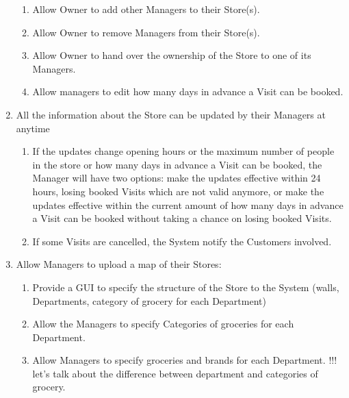 \documentclass[a4paper, 10pt, oneside]{article}
\newcommand*{\lorenzo}[1]{\textcolor{BurntOrange}{#1}}
\begin{document}
\begin{enumerate}[align=left, label={R.\arabic{*}}]
\begin{enumerate}[label={-}]
         \item \label{req:man:updateStoreInfo:addMan}Allow Owner to add other Managers to their Store(s).
        \item \label{req:man:updateStoreInfo:removeMan}Allow Owner to remove Managers from their Store(s).
        \item \label{req:man:updateStoreInfo:handOwnership}Allow Owner to hand over the ownership of the Store to one of its Managers.
        \item \label{req:man:updateStoreInfo:daysToBook}Allow managers to edit how many days in advance a Visit can be booked.
    \end{enumerate}
    
        \item \label{req:man:whenToUpdate}All the information about the Store can be updated by their Managers at anytime
    \begin{enumerate}[label={-}]
        \item \label{req:man:whenToUpdate:whenEffective}If the updates change opening hours or the maximum number of people in the store or how many days in advance a Visit can be booked, the Manager will have two options: make the updates effective within 24 hours, losing booked Visits which are not valid anymore, or make the updates effective within the current amount of how many days in advance a Visit can be booked without taking a chance on losing booked Visits.
        \item \label{req:man:whenToUpdate:lostVisits} If some Visits are cancelled, the System notify the Customers involved.
    \end{enumerate}
    
    \item \label{req:man:uploadMap}Allow Managers to upload a map of their Stores:
    \begin{enumerate}[label={-}]
        \item \label{req:man:uploadMap:GUI}Provide a GUI to specify the structure of the Store to the System (walls, Departments, category of grocery for each Department)
        \item \label{req:man:uploadMap:specCategories}Allow the Managers to specify Categories of groceries for each Department.
        \item \label{req:man:uploadMap:specInCategories}Allow Managers to specify groceries and brands for each Department. \lorenzo{!!! let's talk about the difference between department and categories of grocery.}
    \end{enumerate}
    

\end{enumerate}
\end{document}
